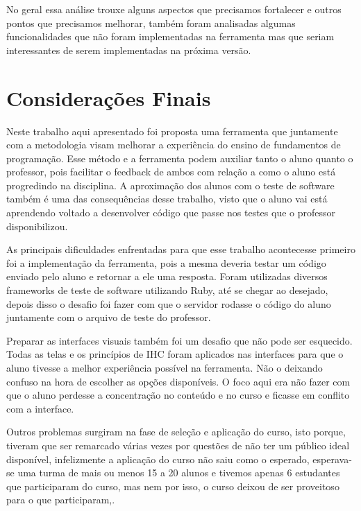 \documentclass[pnumabnt,normaltoc,espacoumemeio,capchap]{abnt}
\begin{document}
\par No geral essa análise trouxe alguns aspectos que precisamos fortalecer e outros pontos que precisamos melhorar, também foram analisadas algumas funcionalidades que não foram implementadas na ferramenta mas que seriam interessantes de serem implementadas na próxima versão.


\chapter{Considerações Finais}

\par Neste trabalho aqui apresentado foi proposta uma ferramenta que juntamente com a metodologia visam melhorar a experiência do ensino de fundamentos de programação. Esse método e a ferramenta podem auxiliar tanto o aluno quanto o professor, pois facilitar o feedback de ambos com relação a como o aluno está progredindo na disciplina. A aproximação dos alunos com o teste de software também é uma das consequências desse trabalho, visto que o aluno vai está aprendendo voltado a desenvolver código que passe nos testes que o professor disponibilizou.

\par As principais dificuldades enfrentadas para que esse trabalho acontecesse primeiro foi a implementação da ferramenta, pois a mesma deveria testar um código enviado pelo aluno e retornar a ele uma resposta. Foram utilizadas diversos frameworks de teste de software utilizando Ruby, até se chegar ao desejado, depois disso o desafio foi fazer com que o servidor rodasse o código do aluno juntamente com o arquivo de teste do professor.
\par Preparar as interfaces visuais também foi um desafio que não pode ser esquecido. Todas as telas e os princípios de IHC foram aplicados nas interfaces para que o aluno tivesse a melhor experiência possível na ferramenta. Não o deixando confuso na hora de escolher as opções disponíveis. O foco aqui era não fazer com que o aluno perdesse a concentração no conteúdo e no curso e ficasse em conflito com a interface.

\par Outros problemas surgiram na fase de seleção e aplicação do curso, isto porque, tiveram que ser remarcado várias vezes por questões de não ter um público ideal disponível, infelizmente a aplicação do curso não saiu como o esperado, esperava-se uma turma de mais ou menos 15 a 20 alunos e tivemos apenas 6 estudantes que participaram do curso, mas nem por isso, o curso deixou de ser proveitoso para o que participaram,. 
\end{document}
